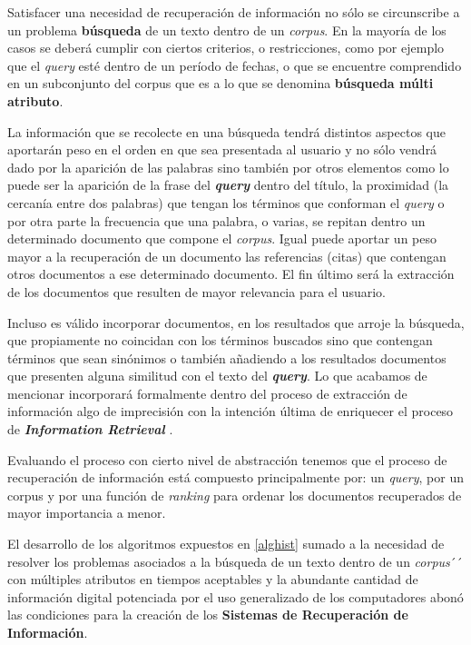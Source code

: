 \documentclass[
  10,
  openany]{book}
\begin{document}
Satisfacer una necesidad de recuperación de información no sólo se circunscribe a un problema \textbf{búsqueda} de un texto dentro de un \emph{corpus}. En la mayoría de los casos se deberá cumplir con ciertos criterios, o restricciones, como por ejemplo que el \emph{query} esté dentro de un período de fechas, o que se encuentre comprendido en un subconjunto del corpus que es a lo que se denomina \textbf{búsqueda múlti atributo}.

La información que se recolecte en una búsqueda tendrá distintos aspectos que aportarán peso en el orden en que sea presentada al usuario y no sólo vendrá dado por la aparición de las palabras sino también por otros elementos como lo puede ser la aparición de la frase del \textbf{\emph{query}} dentro del título, la proximidad (la cercanía entre dos palabras) que tengan los términos que conforman el \emph{query} o por otra parte la frecuencia que una palabra, o varias, se repitan dentro un determinado documento que compone el \emph{corpus}. Igual puede aportar un peso mayor a la recuperación de un documento las referencias (citas) que contengan otros documentos a ese determinado documento. El fin último será la extracción de los documentos que resulten de mayor relevancia para el usuario.

Incluso es válido incorporar documentos, en los resultados que arroje la búsqueda, que propiamente no coincidan con los términos buscados sino que contengan términos que sean sinónimos o también añadiendo a los resultados documentos que presenten alguna similitud con el texto del \textbf{\emph{query}}. Lo que acabamos de mencionar incorporará formalmente dentro del proceso de extracción de información algo de imprecisión con la intención última de enriquecer el proceso de \textbf{\emph{Information Retrieval}} \citep{kraft2017}.

Evaluando el proceso con cierto nivel de abstracción tenemos que el proceso de recuperación de información está compuesto principalmente por: un \emph{query}, por un corpus y por una función de \emph{ranking} para ordenar los documentos recuperados de mayor importancia a menor.

El desarrollo de los algoritmos expuestos en \ref{alghist} sumado a la necesidad de resolver los problemas asociados a la búsqueda de un texto dentro de un \emph{corpus}´´ con múltiples atributos en tiempos aceptables y la abundante cantidad de información digital potenciada por el uso generalizado de los computadores abonó las condiciones para la creación de los \textbf{Sistemas de Recuperación de Información}.
\end{document}
